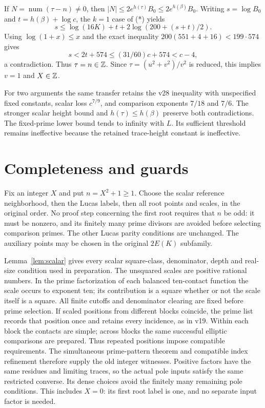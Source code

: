 \documentclass[11pt]{article}
\begin{document}
If $N=\operatorname{num}(\tau-n)\ne0$, then
$|N|\le2e^{h(\tau)}B_0\le2e^{h(\beta)}B_0$.
Writing $s=\log B_0$ and $t=h(\beta)+\log c$, the $k=1$ case of
(*) yields
\[
 s\le\log(16K)+t+2\log(200+(s+t)/2).
\]
Using $\log(1+x)\le x$ and the exact inequality
$200(551+4+16)<199\cdot574$ gives
\[
 s<2t+574\le(31/60)c+574<c-4,
\]
a contradiction. Thus $\tau=n\in\mathbb Z$. Since
$\tau=(u^2+v^2)/v^2$ is reduced, this implies $v=1$ and $X\in\mathbb Z$.

For two arguments the same transfer retains the v28 inequality with
unspecified fixed constants, scalar loss $c^{7/9}$, and comparison
exponents $7/18$ and $7/6$. The stronger scalar height bound and
$h(\tau)\le h(\beta)$ preserve both contradictions. The fixed-prime
lower bound tends to infinity with $L$. Its sufficient threshold remains
ineffective because the retained trace-height constant is ineffective.

\section{Completeness and guards}

Fix an integer $X$ and put $n=X^2+1\ge1$. Choose the scalar reference
neighborhood, then the Lucas labels, then all root points and scales,
in the original order. No proof step concerning the first root requires
that $n$ be odd: it must be nonzero, and its finitely many prime divisors
are avoided before selecting comparison primes. The other Lucas parity
conditions are unchanged. The auxiliary points may be chosen in the
original $2E(K)$ subfamily.

Lemma~\ref{lem:scalar} gives every scalar square-class, denominator,
depth and real-size condition used in preparation. The unsquared
scales are positive rational numbers. In the prime factorization of
each balanced ten-contact function the scale occurs to exponent ten;
its contribution is a square whether or not the scale itself is a
square. All finite cutoffs and denominator clearing are fixed before
prime selection. If scaled positions from different blocks coincide,
the prime list records that position once and retains every incidence,
as in v19. Within each block the contacts are simple; across blocks the
same successful elliptic comparisons are prepared. Thus repeated
positions impose compatible requirements. The simultaneous prime-pattern theorem and compatible
index refinement therefore supply the old integer witnesses. Positive
factors have the same residues and limiting traces, so the actual pole
inputs satisfy the same restricted converse. Its dense choices avoid
the finitely many remaining pole conditions. This includes $X=0$:
its first root label is one, and no separate input factor is needed.
\end{document}
